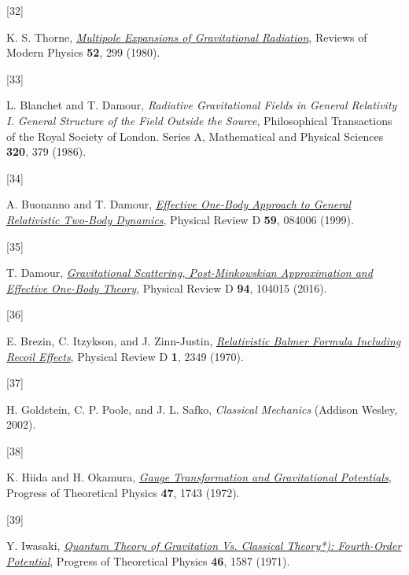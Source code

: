 \documentclass[
  11pt,
  a4paper,
  DIV=11,
  numbers=noendperiod,
  twoside]{scrreprt}
\newlength{\cslhangindent}
\newlength{\csllabelwidth}
\newlength{\cslentryspacingunit} %
\newenvironment{CSLReferences}[2] %
 {%
  \setlength{\parindent}{0pt}
  \ifodd #1
  \let\oldpar\par
  \def\par{\hangindent=\cslhangindent\oldpar}
  \fi
  \setlength{\parskip}{#2\cslentryspacingunit}
 }%
 {}
\newcommand{\CSLLeftMargin}[1]{\parbox[t]{\csllabelwidth}{#1}}
\newcommand{\CSLRightInline}[1]{\parbox[t]{\linewidth - \csllabelwidth}{#1}\break}
\DeclareRobustCommand{\[}{\begin{equation}}
\DeclareRobustCommand{\]}{\end{equation}}
\begin{document}
\begin{CSLReferences}{0}{0}
\leavevmode{}%
\CSLLeftMargin{{[}32{]} }%
\CSLRightInline{K. S. Thorne,
\emph{\href{https://doi.org/10.1103/RevModPhys.52.299}{Multipole
Expansions of Gravitational Radiation}}, Reviews of Modern Physics
\textbf{52}, 299 (1980).}

\leavevmode{}%
\CSLLeftMargin{{[}33{]} }%
\CSLRightInline{L. Blanchet and T. Damour, \emph{Radiative
{Gravitational Fields} in {General Relativity I}. {General Structure} of
the {Field} Outside the {Source}}, Philosophical Transactions of the
Royal Society of London. Series A, Mathematical and Physical Sciences
\textbf{320}, 379 (1986).}

\leavevmode{}%
\CSLLeftMargin{{[}34{]} }%
\CSLRightInline{A. Buonanno and T. Damour,
\emph{\href{https://doi.org/10.1103/PhysRevD.59.084006}{Effective
One-Body Approach to General Relativistic Two-Body Dynamics}}, Physical
Review D \textbf{59}, 084006 (1999).}

\leavevmode{}%
\CSLLeftMargin{{[}35{]} }%
\CSLRightInline{T. Damour,
\emph{\href{https://doi.org/10.1103/PhysRevD.94.104015}{Gravitational
Scattering, Post-{Minkowskian} Approximation and {Effective One-Body}
Theory}}, Physical Review D \textbf{94}, 104015 (2016).}

\leavevmode{}%
\CSLLeftMargin{{[}36{]} }%
\CSLRightInline{E. Brezin, C. Itzykson, and J. Zinn-Justin,
\emph{\href{https://doi.org/10.1103/PhysRevD.1.2349}{Relativistic
{Balmer Formula Including Recoil Effects}}}, Physical Review D
\textbf{1}, 2349 (1970).}

\leavevmode{}%
\CSLLeftMargin{{[}37{]} }%
\CSLRightInline{H. Goldstein, C. P. Poole, and J. L. Safko,
\emph{Classical {Mechanics}} ({Addison Wesley}, 2002).}

\leavevmode{}%
\CSLLeftMargin{{[}38{]} }%
\CSLRightInline{K. Hiida and H. Okamura,
\emph{\href{https://doi.org/10.1143/PTP.47.1743}{Gauge {Transformation}
and {Gravitational Potentials}}}, Progress of Theoretical Physics
\textbf{47}, 1743 (1972).}

\leavevmode{}%
\CSLLeftMargin{{[}39{]} }%
\CSLRightInline{Y. Iwasaki,
\emph{\href{https://doi.org/10.1143/PTP.46.1587}{Quantum {Theory} of
{Gravitation} Vs. {Classical Theory}*): {Fourth-Order Potential}}},
Progress of Theoretical Physics \textbf{46}, 1587 (1971).}


\end{CSLReferences}
\end{document}
